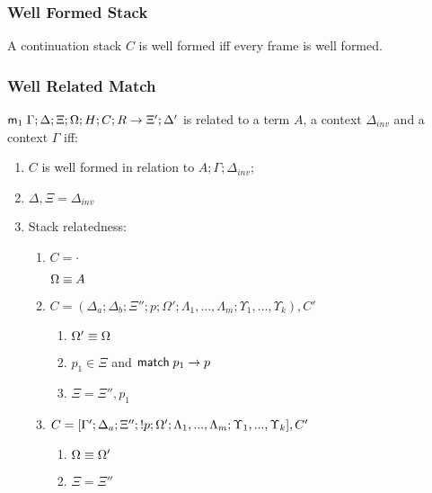 \subsubsection{Well Formed Stack}

\begin{definition}
A continuation stack $C$ is well formed iff every frame is well formed.
\end{definition}

\subsubsection{Well Related Match}

\begin{definition}

$\mathsf{m}_1 \; \Gamma; \Delta; \Xi; \Omega; H; C; R \rightarrow \Xi'; \Delta'$ is related to a term $A$, a context $\Delta_{inv}$  and a context $\Gamma$ iff:

\begin{enumerate}
   \item $C$ is well formed in relation to $A; \Gamma; \Delta_{inv}$;
   \item $\Delta, \Xi = \Delta_{inv}$
   \item Stack relatedness:
   \begin{enumerate}
      \item $C = \cdot$
   
      $\Omega \equiv A$
   
      \item $C = (\Delta_a; \Delta_b; \Xi''; p; \Omega'; \Lambda_1, ..., \Lambda_m; \Upsilon_1, ..., \Upsilon_k), C'$
   
      \begin{enumerate}
         \item $\Omega' \equiv \Omega$
         \item $p_1 \in \Xi$ and $\mathsf{match} \; p_1 \rightarrow p$
         \item $\Xi = \Xi'', p_1$
      \end{enumerate}
      \item $C = [\Gamma'; \Delta_a; \Xi''; {!} p; \Omega'; \Lambda_1, ..., \Lambda_m; \Upsilon_1, ..., \Upsilon_k], C'$
      \begin{enumerate}
         \item $\Omega \equiv \Omega'$
         \item $\Xi = \Xi''$
      \end{enumerate}
   \end{enumerate}
\end{enumerate}

\end{definition}

